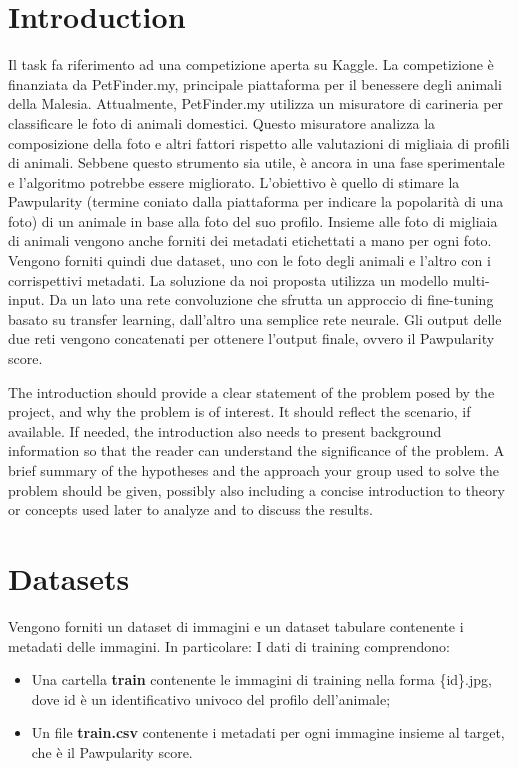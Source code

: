 \section{Introduction}
    Il task fa riferimento ad una competizione aperta su Kaggle.
    La competizione è finanziata da PetFinder.my, principale piattaforma per il benessere degli animali della Malesia.
    Attualmente, PetFinder.my utilizza un misuratore di carineria per classificare le foto di animali domestici. Questo misuratore analizza la composizione della foto e altri fattori rispetto alle valutazioni di migliaia di profili di animali. Sebbene questo strumento sia utile, è ancora in una fase sperimentale e l'algoritmo potrebbe essere migliorato. L'obiettivo è quello di stimare la Pawpularity (termine coniato dalla piattaforma per indicare la popolarità di una foto) di un animale in base alla foto del suo profilo. Insieme alle foto di migliaia di animali vengono anche forniti dei metadati etichettati a mano per ogni foto. Vengono forniti quindi due dataset, uno con le foto degli animali e l'altro con i corrispettivi metadati.
    La soluzione da noi proposta utilizza un modello multi-input. Da un lato una rete convoluzione che sfrutta un approccio di fine-tuning basato su transfer learning, dall'altro una semplice rete neurale. Gli output delle due reti vengono concatenati per ottenere l'output finale, ovvero il Pawpularity score.
    

    The introduction should provide a clear statement of the problem posed by the project, and why the problem is of interest. It should reflect the scenario, if available. If needed, the introduction also needs to present background information so that the reader can understand the significance of the problem. A brief summary of the hypotheses and the approach your group used to solve the problem should be given, possibly also including a concise introduction to theory or concepts used later to analyze and to discuss the results.


\section{Datasets}
    Vengono forniti un dataset di immagini e un dataset tabulare contenente i metadati delle immagini. In particolare:
    I dati di training comprendono:
    \begin{itemize}
        \item Una cartella \textbf{train} contenente le immagini di training nella forma \{id\}.jpg, dove id è un identificativo univoco del profilo dell'animale;
        \item Un file \textbf{train.csv} contenente i metadati per ogni immagine insieme al target, che è il Pawpularity score.
    \end{itemize}

